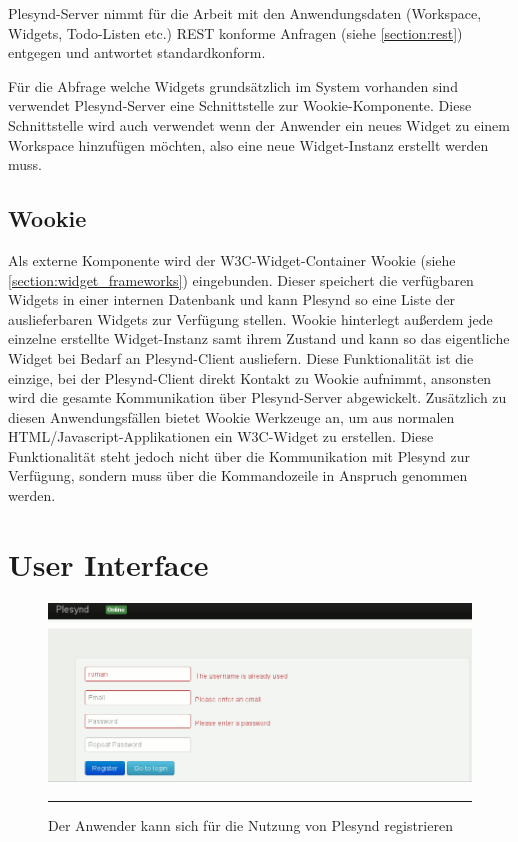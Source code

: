 Plesynd-Server nimmt für die Arbeit mit den Anwendungsdaten (Workspace, Widgets, Todo-Listen etc.) REST konforme Anfragen (siehe \ref{section:rest}) entgegen und antwortet standardkonform.

Für die Abfrage welche Widgets grundsätzlich im System vorhanden sind verwendet Plesynd-Server eine Schnittstelle zur Wookie-Komponente. Diese Schnittstelle wird auch verwendet wenn der Anwender ein neues Widget zu einem Workspace hinzufügen möchten, also eine neue Widget-Instanz erstellt werden muss.

\subsection{Wookie}\label{section:loesung_wookie}
Als externe Komponente wird der W3C-Widget-Container Wookie (siehe \ref{section:widget_frameworks}) eingebunden. Dieser speichert die verfügbaren Widgets in einer internen Datenbank und kann Plesynd so eine Liste der auslieferbaren Widgets zur Verfügung stellen. Wookie hinterlegt außerdem jede einzelne erstellte Widget-Instanz samt ihrem Zustand und kann so das eigentliche Widget bei Bedarf an Plesynd-Client ausliefern. Diese Funktionalität ist die einzige, bei der Plesynd-Client direkt Kontakt zu Wookie aufnimmt, ansonsten wird die gesamte Kommunikation über Plesynd-Server abgewickelt. Zusätzlich zu diesen Anwendungsfällen bietet Wookie Werkzeuge an, um aus normalen HTML/Javascript-Applikationen ein W3C-Widget zu erstellen. Diese Funktionalität steht jedoch nicht über die Kommunikation mit Plesynd zur Verfügung, sondern muss über die Kommandozeile in Anspruch genommen werden.

\section{User Interface}\label{section:user_interface}
\begin{figure}
  \centering
  \includegraphics[width=\textwidth,height=\textheight,keepaspectratio]{./Figures/plesynd_register.png}
    \rule{35em}{0.5pt}
  \caption[Plesynd User-Interface: Registrieren]{Der Anwender kann sich für die Nutzung von Plesynd registrieren}
  \label{fig:plesynd_register}
\end{figure}

